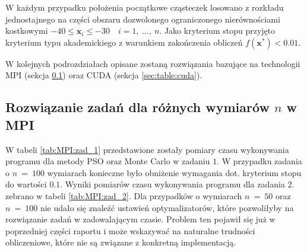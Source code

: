 \documentclass[11pt, a4paper, oneside]{article}
\newcommand{\vect}[1]{\bm{\mathbf{#1}}}
\begin{document}
W każdym przypadku położenia początkowe cząsteczek losowano z rozkładu jednostajnego na części obszaru dozwolonego ograniczonego nierównościami kostkowymi $-40 \leq \vect{x}_i \leq -30 \quad i = 1, \ ..., \ n$. Jako kryterium stopu przyjęto kryterium typu akademickiego z warunkiem zakończenia obliczeń $f\left(\vect{x}^{*}\right) < 0.01$.

W kolejnych podrozdziałach opisane zostaną rozwiązania bazujące na technologii MPI (sekcja \ref{sec:table:mpi}) oraz CUDA (sekcja \ref{sec:table:cuda}).

\subsection{Rozwiązanie zadań dla różnych wymiarów $n$ w MPI} \label{sec:table:mpi}

W tabeli \ref{tab:MPI:zad_1} przedstawione zostały pomiary czasu wykonywania programu dla metody PSO oraz Monte Carlo w zadaniu $1$. W przypadku zadania o $n \ = \ 100$ wymiarach konieczne było obniżenie wymagania dot. kryterium stopu do wartości $0.1$. Wyniki pomiarów czasu wykonywania programu dla zadania $2$. zebrano w tabeli  \ref{tab:MPI:zad_2}. Dla przypadków o wymiarach $n \ = \ 50$ oraz $n \ = \ 100$ nie udało się znaleźć ustawień optymalizatorów, które pozwoliłyby na rozwiązanie zadań w zadowalającym czasie. Problem ten pojawił się już w poprzedniej części raportu i może wskazywać na naturalne trudności obliczeniowe, które nie są związane z konkretną implementacją.
\end{document}

